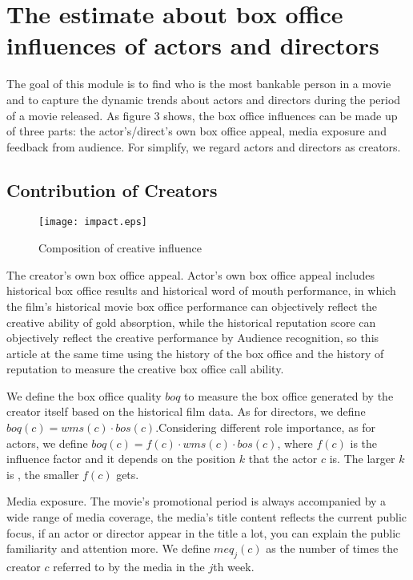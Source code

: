 \section{The estimate about box office influences of actors and directors}
\label{sec:impact}
\par The goal of this module is to find who is the most bankable person in a movie and to capture the dynamic trends about actors and directors during the period of a movie released. As figure 3 shows, the box office influences can be made up of three parts: the actor's/direct's own box office appeal, media exposure and feedback from audience. For simplify, we regard actors and directors as creators.\\

\subsection{Contribution of Creators}
\begin{figure}[!htbp]
\centering
\texttt{[image: impact.eps]}
\caption{Composition of creative influence}
\label{fig:mhin}
\end{figure}
\par The creator's own box office appeal. Actor's own box office appeal includes historical box office results and historical word of mouth performance, in which the film's historical movie box office performance can objectively reflect the creative ability of gold absorption, while the historical reputation score can objectively reflect the creative performance by Audience recognition, so this article at the same time using the history of the box office and the history of reputation to measure the creative box office call ability.\\
\par We define the box office quality $boq$ to measure the box office generated by the creator itself based on the historical film data. 
As for directors, we define $boq(c)=wms(c)\cdot bos(c)$.Considering different role importance, as for actors, we define $boq(c) = f(c)\cdot wms(c)\cdot bos(c)$, where $f(c)$ is the influence factor and it depends on the position $k$ that the actor $c$ is. The larger $k$ is , the smaller $f(c)$ gets.\\
\par Media exposure. The movie's promotional period is always accompanied by a wide range of media coverage, the media's title content reflects the current public focus, if an actor or director appear in the title a lot, you can explain the public familiarity and attention more. We define $meq_j(c)$ as the number of times the creator $c$ referred to by the media in the $j$th week.\\
